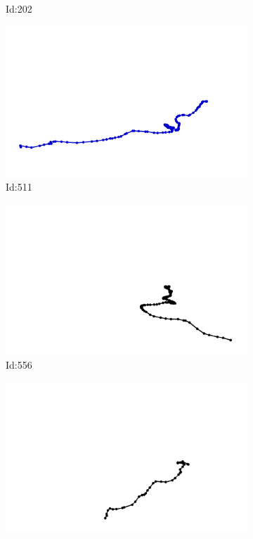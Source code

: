 \documentclass[12pt,twoside]{report}
\begin{document}
\begin{figure}
\begin{subfigure}[b]{0.20\textwidth}
\caption{Id:202}
\end{subfigure}
\begin{subfigure}[b]{0.20\textwidth}
\centering
\includegraphics[width=\textwidth]{../trajectories/511.png}
\caption{Id:511}
\end{subfigure}
\begin{subfigure}[b]{0.20\textwidth}
\centering
\includegraphics[width=\textwidth]{../trajectories/556.png}
\caption{Id:556}
\end{subfigure}
\begin{subfigure}[b]{0.20\textwidth}
\centering
\includegraphics[width=\textwidth]{../trajectories/570.png}

\end{subfigure}
\end{figure}
\end{document}
